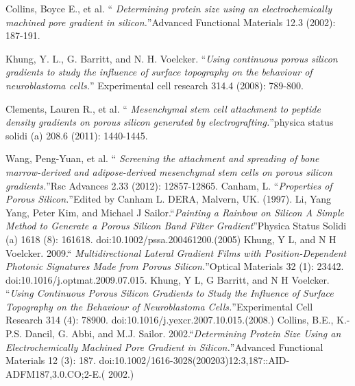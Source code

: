\documentclass{article}
\begin{document}
\begin{thebibliography}{X}
Collins, Boyce E., et al. \textquotedblleft \emph{
    Determining protein size using an electrochemically machined
    pore gradient in silicon.}\textquotedblright Advanced Functional
  Materials 12.3 (2002): 187-191.

 Khung, Y. L., G. Barritt, and
  N. H. Voelcker. \textquotedblleft \emph{Using continuous porous
    silicon gradients to study the influence of surface topography
    on the behaviour of neuroblastoma cells.}\textquotedblright
  Experimental cell research 314.4 (2008): 789-800.

 Clements, Lauren R., et al. \textquotedblleft
  \emph{Mesenchymal stem cell attachment to peptide density
    gradients on porous silicon generated by
    electrografting.}\textquotedblright physica status solidi (a)
  208.6 (2011): 1440-1445.

 Wang, Peng-Yuan, et al. \textquotedblleft
  \emph{Screening the attachment and spreading of bone
    marrow-derived and adipose-derived mesenchymal stem cells on
    porous silicon gradients.}\textquotedblright Rsc Advances 2.33
  (2012): 12857-12865.
 Canham, L. \textquotedblleft \emph{Properties of
    Porous Silicon.}\textquotedblright Edited by Canham L. DERA,
  Malvern, UK. (1997).
 Li, Yang Yang, Peter Kim, and Michael J
  Sailor.\textquotedblleft \emph{Painting a Rainbow on Silicon A
    Simple Method to Generate a Porous Silicon Band Filter
    Gradient}\textquotedblright Physica Status Solidi (a) 1618 (8):
  161618. doi:10.1002/pssa.200461200.(2005)
 Khung, Y L, and N H
  Voelcker. 2009.\textquotedblleft\emph{ Multidirectional Lateral
    Gradient Films with Position-Dependent Photonic Signatures Made
    from Porous Silicon.}\textquotedblright Optical Materials 32
  (1): 23442. doi:10.1016/j.optmat.2009.07.015.
  Khung, Y L, G Barritt, and N H Voelcker.
  \textquotedblleft \emph{Using Continuous Porous Silicon Gradients
    to Study the Influence of Surface Topography on the Behaviour of
    Neuroblastoma Cells.}\textquotedblright Experimental Cell
  Research 314 (4): 78900. doi:10.1016/j.yexcr.2007.10.015.(2008.)
 Collins, B.E., K.-P.S. Dancil, G. Abbi, and
  M.J. Sailor. 2002.\textquotedblleft \emph{Determining Protein Size
    Using an Electrochemically Machined Pore Gradient in
    Silicon.}\textquotedblright Advanced Functional Materials 12 (3):
  187. doi:10.1002/1616-3028(200203)12:3,187::AID-ADFM187,3.0.CO;2-E.(
  2002.)


\end{thebibliography}
\end{document}
